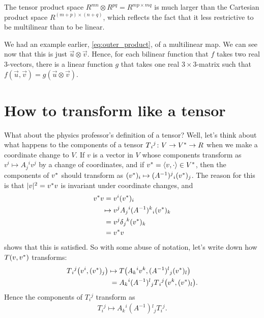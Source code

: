 \documentclass[english, 12pt]{article}
\begin{document}
The tensor product space $R^{mn} \otimes R^{pq} = R^{mp \times mq}$ is much larger than the Cartesian product space $R^{(m + p) \times (n + q)}$, which reflects the fact that it less restrictive to be multilinear than to be linear.

We had an example earlier, \cref{eq:outer_product}, of a multilinear map.
We can see now that this is just $\vec u \otimes \vec v$.
Hence, for each bilinear function that $f$ takes two real $3$-vectors, there is a linear function $g$ that takes one real $3\times3$-matrix such that $f(\vec u, \vec v) = g(\vec u \otimes \vec v)$.

\section{How to transform like a tensor}%
\label{sec:how_to_transform_like_a_tensor}

What about the physics professor's definition of a tensor?
Well, let's think about what happens to the components of a tensor \(T{}_i{}^j \colon V \to {V}^{\ast} \to R\) when we make a coordinate change to \(V\).
If \(v\) is a vector in \(V\) whose components transform as \(v{}^i \mapsto A{}_j{}^i v{}^j\) by a change of coordinates, and if \({v}^{\ast} = \langle v, \cdot \rangle \in {V}^{\ast}\), then the components of \({v}^{\ast}\) should transform as \(({v}^{\ast})_i \mapsto (A^{-1}){}^j{}_i ({v}^{\ast}){}_j\).
The reason for this is that \(|v|^2 = {v}^{\ast} v\) is invariant under coordinate changes, and
\begin{align*}
	{v}^{\ast} v ={}& v{}^i ({v}^{\ast}){}_i\\
	\mapsto{}& v{}^j A{}_j{}^i (A^{-1}){}^k{}_i ({v}^{\ast}){}_k\\
	={}& v{}^j \delta{}_j{}^k ({v}^{\ast}){}_k\\
	={}& {v}^{\ast} v
\end{align*}
shows that this is satisfied.
So with some abuse of notation, let's write down how \(T(v, {v}^{\ast})\) transforms:
\begin{align*}
	T{}_i{}^j\big(
		v{}^i,
		({v}^{\ast}){}_j
	\big)
	\mapsto{}& T\big(
		A{}_k{}^i v{}^k,
		(A^{-1}){}^l{}_j ({v}^{\ast}){}_l
	\big)\\
	={}& A{}_k{}^i (A^{-1}){}^l{}_j T{}_i{}^j
	\big(
		v{}^k,
		({v}^{\ast}){}_l
	\big).
\end{align*}
Hence the components of \(T{}_i{}^j\) transform as
\begin{align}\label{eq:tensor_transformation_rules}
	T{}_i{}^j \mapsto A{}_k{}^i (A^{-1}){}^l{}_j T{}_i{}^j.
\end{align}
\end{document}
